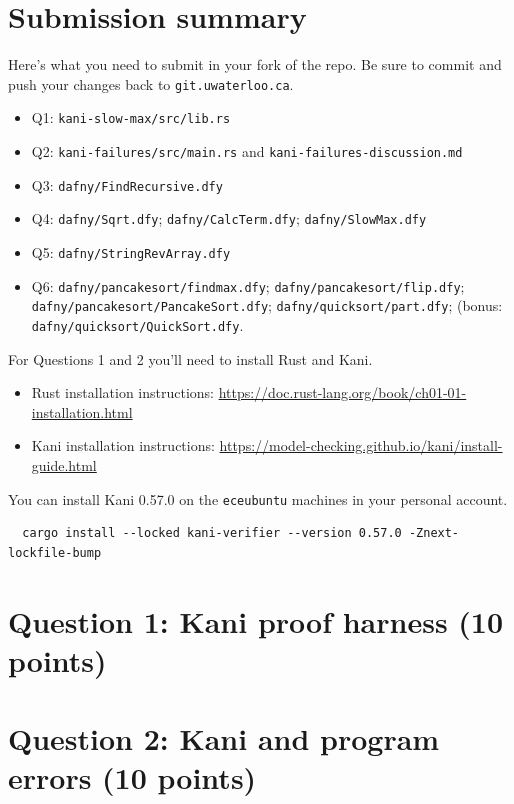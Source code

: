 \documentclass[10pt,hidelinks]{article}
\begin{document}
\section*{Submission summary}
Here's what you need to submit in your fork of the repo. Be sure to commit
and push your changes back to {\tt git.uwaterloo.ca}.

\begin{itemize}
\item Q1: \texttt{kani-slow-max/src/lib.rs}
\item Q2: \texttt{kani-failures/src/main.rs} and \texttt{kani-failures-discussion.md}
\item Q3: \texttt{dafny/FindRecursive.dfy}
\item Q4: \texttt{dafny/Sqrt.dfy}; \texttt{dafny/CalcTerm.dfy}; \texttt{dafny/SlowMax.dfy}
\item Q5: \texttt{dafny/StringRevArray.dfy}
\item Q6: \texttt{dafny/pancakesort/findmax.dfy}; \texttt{dafny/pancakesort/flip.dfy}; \texttt{dafny/pancakesort/PancakeSort.dfy}; \texttt{dafny/quicksort/part.dfy}; (bonus: \texttt{dafny/quicksort/QuickSort.dfy}.
\end{itemize}
  
\newpage
For Questions 1 and 2 you'll need to install Rust and Kani. 
\begin{itemize}
  \item Rust installation instructions: \url{https://doc.rust-lang.org/book/ch01-01-installation.html}
  \item Kani installation instructions: \url{https://model-checking.github.io/kani/install-guide.html}
\end{itemize}
You can install Kani 0.57.0 on the \texttt{eceubuntu} machines in your personal account.
\begin{verbatim}
  cargo install --locked kani-verifier --version 0.57.0 -Znext-lockfile-bump
\end{verbatim}

\section*{Question 1: Kani proof harness (10 points)}


\section*{Question 2: Kani and program errors (10 points)}

\end{document}
